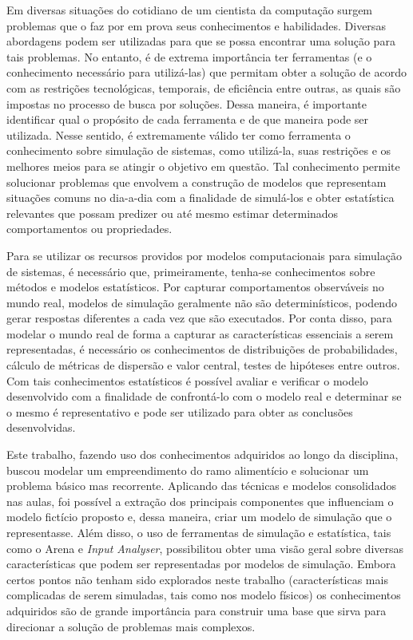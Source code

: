 \documentclass[pt,disc,oneside]{ufscpgeasthesis}
\begin{document}
		Em diversas situações do cotidiano de um cientista da computação surgem problemas que o faz por em prova seus conhecimentos e habilidades.
		Diversas abordagens podem ser utilizadas para que se possa encontrar uma solução para tais problemas.
		No entanto, é de extrema importância ter ferramentas (e o conhecimento necessário para utilizá-las) que permitam obter a solução de acordo com as restrições tecnológicas, temporais, de eficiência entre outras, as quais são impostas no processo de busca por soluções.
		Dessa maneira, é importante identificar qual o propósito de cada ferramenta e de que maneira pode ser utilizada.
		Nesse sentido, é extremamente válido ter como ferramenta o conhecimento sobre simulação de sistemas, como utilizá-la, suas restrições e os melhores meios para se atingir o objetivo em questão.
		Tal conhecimento permite solucionar problemas que envolvem a construção de modelos que representam situações comuns no dia-a-dia com a finalidade de simulá-los e obter estatística relevantes que possam predizer ou até mesmo estimar determinados comportamentos ou propriedades.

		Para se utilizar os recursos providos por modelos computacionais para simulação de sistemas, é necessário que, primeiramente, tenha-se conhecimentos sobre métodos e modelos estatísticos.
		Por capturar comportamentos observáveis no mundo real, modelos de simulação geralmente não são determinísticos, podendo gerar respostas diferentes a cada vez que são executados.
		Por conta disso, para modelar o mundo real de forma a capturar as características essenciais a serem representadas, é necessário os conhecimentos de distribuições de probabilidades, cálculo de métricas de dispersão e valor central, testes de hipóteses entre outros.
		Com tais conhecimentos estatísticos é possível avaliar e verificar o modelo desenvolvido com a finalidade de confrontá-lo com o modelo real e determinar se o mesmo é representativo e pode ser utilizado para obter as conclusões desenvolvidas.

		Este trabalho, fazendo uso dos conhecimentos adquiridos ao longo da disciplina, buscou modelar um empreendimento do ramo alimentício e solucionar um problema básico mas recorrente.
		Aplicando das técnicas e modelos consolidados nas aulas, foi possível a extração dos principais componentes que influenciam o modelo fictício proposto e, dessa maneira, criar um modelo de simulação que o representasse.
		Além disso, o uso de ferramentas de simulação e estatística, tais como o Arena e \textit{Input Analyser}, possibilitou obter uma visão geral sobre diversas características que podem ser representadas por modelos de simulação.
		Embora certos pontos não tenham sido explorados neste trabalho (características mais complicadas de serem simuladas, tais como nos modelo físicos) os conhecimentos adquiridos são de grande importância para construir uma base que sirva para direcionar a solução de problemas mais complexos.
\end{document}
